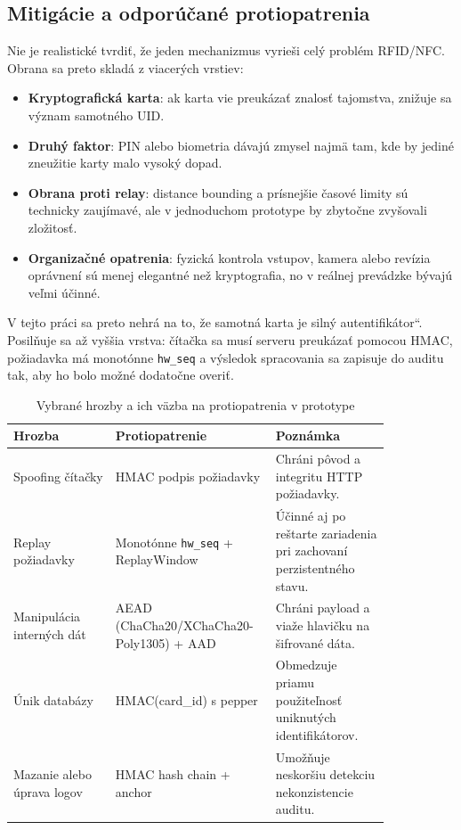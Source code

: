 \documentclass[journal,a4paper,onecolumn]{IEEEtran}
\newcommand{\uv}[1]{\quotedblbase#1\textquotedblleft}
\begin{document}
\subsection{Mitigácie a odporúčané protiopatrenia}

Nie je realistické tvrdiť, že jeden mechanizmus vyrieši celý problém RFID/NFC. Obrana sa preto skladá z viacerých vrstiev:

\begin{itemize}[leftmargin=*,itemsep=2pt]
  \item \textbf{Kryptografická karta}: ak karta vie preukázať znalosť tajomstva, znižuje sa význam samotného UID.
  \item \textbf{Druhý faktor}: PIN alebo biometria dávajú zmysel najmä tam, kde by jediné zneužitie karty malo vysoký dopad.
  \item \textbf{Obrana proti relay}: distance bounding a prísnejšie časové limity sú technicky zaujímavé, ale v jednoduchom prototype by zbytočne zvyšovali zložitosť.
  \item \textbf{Organizačné opatrenia}: fyzická kontrola vstupov, kamera alebo revízia oprávnení sú menej elegantné než kryptografia, no v reálnej prevádzke bývajú veľmi účinné.
\end{itemize}

V tejto práci sa preto nehrá na to, že samotná karta je \uv{silný autentifikátor}. Posilňuje sa až vyššia vrstva: čítačka sa musí serveru preukázať pomocou HMAC, požiadavka má monotónne \texttt{hw\_seq} a výsledok spracovania sa zapisuje do auditu tak, aby ho bolo možné dodatočne overiť.


\begin{table}[!ht]
\renewcommand{\arraystretch}{1.3}
\centering
\caption{Vybrané hrozby a ich väzba na protiopatrenia v prototype}
\label{tab:threats_countermeasures}
\small
\begin{tabular}{p{0.25\linewidth} p{0.31\linewidth} p{0.28\linewidth}}
\toprule
\textbf{Hrozba} & \textbf{Protiopatrenie} & \textbf{Poznámka} \\
\midrule
Spoofing čítačky & HMAC podpis požiadavky & Chráni pôvod a integritu HTTP požiadavky. \\
Replay požiadavky & Monotónne \texttt{hw\_seq} + ReplayWindow & Účinné aj po reštarte zariadenia pri zachovaní perzistentného stavu. \\
Manipulácia interných dát & AEAD (ChaCha20/XChaCha20-Poly1305) + AAD & Chráni payload a viaže hlavičku na šifrované dáta. \\
Únik databázy & HMAC(card\_id) s pepper & Obmedzuje priamu použiteľnosť uniknutých identifikátorov. \\
Mazanie alebo úprava logov & HMAC hash chain + anchor & Umožňuje neskoršiu detekciu nekonzistencie auditu. \\
\bottomrule
\end{tabular}
\normalsize
\end{table}
\end{document}
